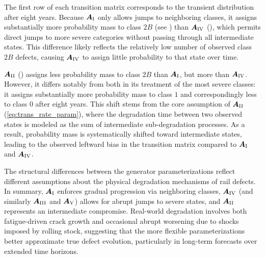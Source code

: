 The first row of each transition matrix corresponds to the transient distribution after eight years.
Because $\bm{A}_{\RN{1}}$ only allows jumps to neighboring classes, it assigns substantially more probability mass to class $2B$ (see ) than $\bm{A}_{\RN{4}}$ (), which permits direct jumps to more severe categories without passing through all intermediate states.
This difference likely reflects the relatively low number of observed class $2B$ defects, causing $\bm{A}_{\RN{4}}$ to assign little probability to that state over time.

$\bm{A}_{\RN{2}}$ () assigns less probability mass to class $2B$ than $\bm{A}_{\RN{1}}$, but more than $\bm{A}_{\RN{4}}$. However, it differs notably from both in its treatment of the most severe classes: it assigns substantially more probability mass to class $1$ and correspondingly less to class $0$ after eight years.
This shift stems from the core assumption of $\bm{A}_{\RN{2}}$ (\cref{eq:trans_rate_param}), where the degradation time between two observed states is modeled as the sum of intermediate sub-degradation processes.
As a result, probability mass is systematically shifted toward intermediate states, leading to the observed leftward bias in the transition matrix compared to $\bm{A}_{\RN{1}}$ and $\bm{A}_{\RN{4}}$.

The structural differences between the generator parameterizations reflect different assumptions about the physical degradation mechanisms of rail defects.
In summary, $\bm{A}_{\RN{1}}$ enforces gradual progression via neighboring classes, $\bm{A}_{\RN{4}}$ (and similarly $\bm{A}_{\RN{3}}$ and $\bm{A}_{\RN{5}}$) allows for abrupt jumps to severe states, and $\bm{A}_{\RN{2}}$ represents an intermediate compromise. Real-world degradation involves both fatigue-driven crack growth and occasional abrupt worsening due to shocks imposed by rolling stock, suggesting that the more flexible parameterizations better approximate true defect evolution, particularly in long-term forecasts over extended time horizons.


